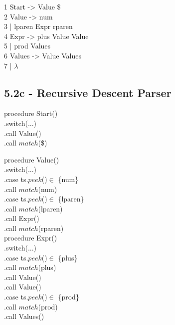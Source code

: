 \documentclass[letterpaper, 10pt,DIV=13]{scrartcl}
\numberwithin{equation}{section} %
\numberwithin{figure}{section} %
\numberwithin{table}{section} %
\begin{document}
1 Start -> Value \$ \\
2 Value -> num \\
3 \hspace{1cm} | lparen Expr rparen \\
4 Expr -> plus Value Value \\
5 \hspace{1cm} | prod Values \\
6 Values -> Value Values \\
7 \hspace{1cm} | $\lambda$

\subsection{5.2c - Recursive Descent Parser}

procedure Start() \\
.\hspace{1cm}switch(...)\\
.\hspace{2cm}call Value() \\
.\hspace{2cm}call $match$(\$)

procedure Value() \\
.\hspace{1cm}switch(...)\\
.\hspace{2cm}case ts.$peek$()$\in$ \{num\} \\
.\hspace{3cm}call $match$(num) \\
.\hspace{2cm}case ts.$peek$()$\in$ \{lparen\} \\
.\hspace{3cm}call $match$(lparen) \\
.\hspace{3cm}call Expr() \\
.\hspace{3cm}call $match$(rparen) \\


procedure Expr() \\
.\hspace{1cm}switch(...)\\
.\hspace{2cm}case ts.$peek$()$\in$ \{plus\} \\
.\hspace{3cm}call $match$(plus) \\
.\hspace{3cm}call Value() \\
.\hspace{3cm}call Value() \\
.\hspace{2cm}case ts.$peek$()$\in$ \{prod\} \\
.\hspace{3cm}call $match$(prod) \\
.\hspace{3cm}call Values() \\
\end{document}

